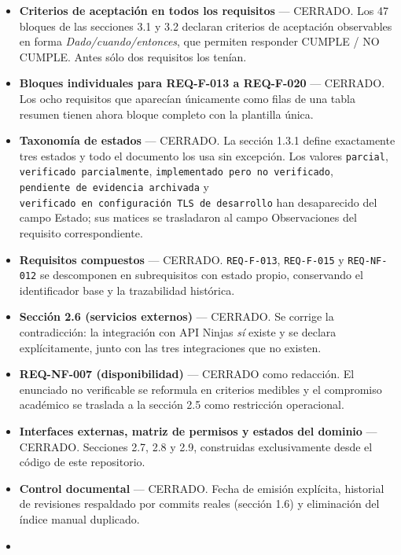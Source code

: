 \documentclass[
  spanish,
]{article}
\providecommand{\tightlist}{%
  \setlength{\itemsep}{0pt}\setlength{\parskip}{0pt}}
\begin{document}
\begin{itemize}
\tightlist
\item
  \textbf{Criterios de aceptación en todos los requisitos} --- CERRADO.
  Los 47 bloques de las secciones 3.1 y 3.2 declaran criterios de
  aceptación observables en forma \emph{Dado/cuando/entonces}, que
  permiten responder CUMPLE / NO CUMPLE. Antes sólo dos requisitos los
  tenían.
\item
  \textbf{Bloques individuales para REQ-F-013 a REQ-F-020} --- CERRADO.
  Los ocho requisitos que aparecían únicamente como filas de una tabla
  resumen tienen ahora bloque completo con la plantilla única.
\item
  \textbf{Taxonomía de estados} --- CERRADO. La sección 1.3.1 define
  exactamente tres estados y todo el documento los usa sin excepción.
  Los valores \texttt{parcial}, \texttt{verificado\ parcia\allowbreak{}lmente},
  \texttt{implementado\ pero\ n\allowbreak{}o\ verificado},
  \texttt{pendiente\ de\ evide\allowbreak{}ncia\ archivada} y
  \texttt{verificado\ en\ conf\allowbreak{}iguración\ TLS\ de\ de\allowbreak{}sarrollo} han
  desaparecido del campo Estado; sus matices se trasladaron al campo
  Observaciones del requisito correspondiente.
\item
  \textbf{Requisitos compuestos} --- CERRADO. \texttt{REQ-\allowbreak{}F-\allowbreak{}013},
  \texttt{REQ-\allowbreak{}F-\allowbreak{}015} y \texttt{REQ-\allowbreak{}NF-\allowbreak{}012} se descomponen en
  subrequisitos con estado propio, conservando el identificador base y
  la trazabilidad histórica.
\item
  \textbf{Sección 2.6 (servicios externos)} --- CERRADO. Se corrige la
  contradicción: la integración con API Ninjas \emph{sí} existe y se
  declara explícitamente, junto con las tres integraciones que no
  existen.
\item
  \textbf{REQ-NF-007 (disponibilidad)} --- CERRADO como redacción. El
  enunciado no verificable se reformula en criterios medibles y el
  compromiso académico se traslada a la sección 2.5 como restricción
  operacional.
\item
  \textbf{Interfaces externas, matriz de permisos y estados del dominio}
  --- CERRADO. Secciones 2.7, 2.8 y 2.9, construidas exclusivamente
  desde el código de este repositorio.
\item
  \textbf{Control documental} --- CERRADO. Fecha de emisión explícita,
  historial de revisiones respaldado por commits reales (sección 1.6) y
  eliminación del índice manual duplicado.
\item

\end{itemize}
\end{document}
